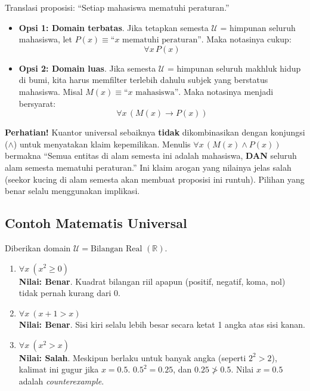 \begin{contoh}
Translasi proposisi: ``Setiap mahasiswa mematuhi peraturan.''
\begin{itemize}
    \item \textbf{Opsi 1: Domain terbatas}. Jika tetapkan semesta $\mathcal{U}$ = himpunan seluruh mahasiswa, let $P(x) \equiv \text{``}x \text{ mematuhi peraturan''}$. Maka notasinya cukup:
    \[ \forall x \, P(x) \]
    
    \item \textbf{Opsi 2: Domain luas}. Jika semesta $\mathcal{U}$ = himpunan seluruh makhluk hidup di bumi, kita harus memfilter terlebih dahulu subjek yang berstatus mahasiswa. Misal $M(x) \equiv \text{``}x \text{ mahasiswa''}$. Maka notasinya menjadi bersyarat:
    \[ \forall x \, (M(x) \rightarrow P(x)) \]
\end{itemize}
\end{contoh}

\begin{catatan}
\textbf{Perhatian!} Kuantor universal sebaiknya \textbf{tidak} dikombinasikan dengan konjungsi ($\wedge$) untuk menyatakan klaim kepemilikan. Menulis $\forall x \, (M(x) \land P(x))$ bermakna ``Semua entitas di alam semesta ini adalah mahasiswa, \textbf{DAN} seluruh alam semesta mematuhi peraturan.'' Ini klaim arogan yang nilainya jelas salah (seekor kucing di alam semesta akan membuat proposisi ini runtuh). Pilihan yang benar selalu menggunakan implikasi.
\end{catatan}

\subsection{Contoh Matematis Universal}

\begin{contoh}
Diberikan domain $\mathcal{U} = \text{Bilangan Real } (\mathbb{R})$.
\begin{enumerate}
    \item $\forall x \ (x^2 \geq 0)$ \\ \textbf{Nilai: Benar}. Kuadrat bilangan riil apapun (positif, negatif, koma, nol) tidak pernah kurang dari 0.
    \item $\forall x \ (x + 1 > x)$ \\ \textbf{Nilai: Benar}. Sisi kiri selalu lebih besar secara ketat 1 angka atas sisi kanan.
    \item $\forall x \ (x^2 > x)$ \\ \textbf{Nilai: Salah}. Meskipun berlaku untuk banyak angka (seperti $2^2 > 2$), kalimat ini gugur jika $x = 0.5$. $0.5^2 = 0.25$, dan $0.25 \not> 0.5$. Nilai $x=0.5$ adalah \textit{counterexample}.
\end{enumerate}
\end{contoh}
